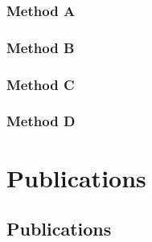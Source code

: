 \documentclass[%
paper=A4,					%
twoside=true,				%
openright,					%
parskip=full,				%
chapterprefix=true,			%
11pt,						%
headings=normal,			%
bibliography=totoc,			%
listof=totoc,				%
titlepage=on,				%
captions=tableabove,		%
draft=false,				%
]{scrreprt}%
\begin{document}
\subsection{Method A}

\newpage
\subsection{Method B}

\newpage
\subsection{Method C}

\newpage
\subsection{Method D}

\chapter{Publications}
\section{Publications}
\label{sec:label}

% 

\end{document}
